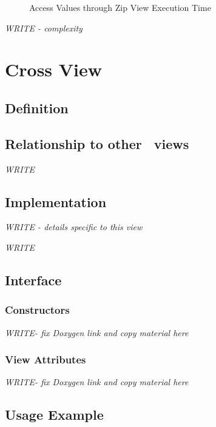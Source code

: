 \begin{figure}[p]
\caption{Access Values through Zip View Execution Time}
\label{fig:zip-vw-access-exper}
\end{figure}

\emph{WRITE - complexity}


\section{Cross View} \label{sec-cross-vw}

\subsection{Definition}

\subsection{Relationship to other \stapl\ views}

\textit{WRITE}

\subsection{Implementation}

\textit{WRITE - details specific to this view}

\emph{WRITE}

\subsection{Interface} \label{sec-cross-vw-inter}

\subsubsection{Constructors}

\textit{WRITE-  fix Doxygen link and copy material here}

\subsubsection{View Attributes}

\textit{WRITE-  fix Doxygen link and copy material here}

\subsection{Usage Example} \label{sec-cross-vw-use}

